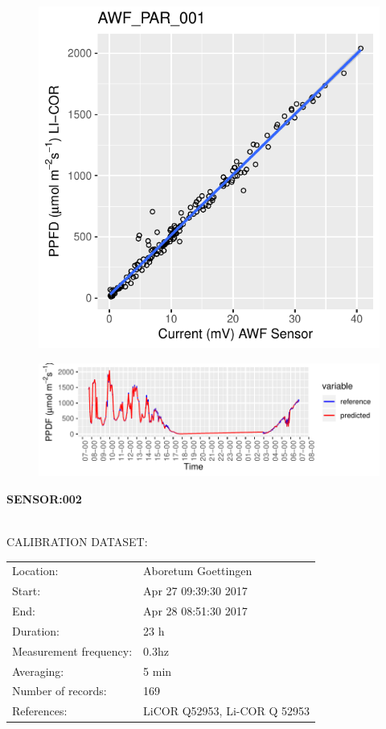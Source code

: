 \documentclass[oneside]{report}
\begin{document}
\begin{figure}[H]
  \centering
  \includegraphics[width=0.4\linewidth]{graphs/AWF_PAR_001_scatter.pdf}
\end{figure}




\begin{figure}[H]
  \centering
  \includegraphics[width=0.7\linewidth]{graphs/AWF_PAR_001_pred.pdf}
\end{figure}

\pagebreak


\begin{center}
\large{\textbf{SENSOR:002}}\\
\end{center}

\hrulefill\\
CALIBRATION DATASET:\\
\begin{table}[h!]
  \centering
  \label{tab:table1}
  \begin{tabular}{ll}
    Location: & Aboretum Goettingen\\ 
    
    
    Start:  & Apr 27 09:39:30 2017 \\
    End:   & Apr 28 08:51:30 2017\\ 
    Duration: & 23 h\\
    Measurement frequency: & 0.3hz\\
    Averaging:  &5 min\\
    Number of records: & 169 \\
    References: & LiCOR Q52953, Li-COR Q 52953 \\
  \end{tabular}
\end{table}
\end{document}
